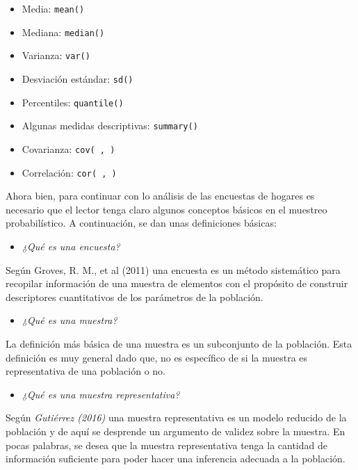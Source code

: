 \documentclass[
  spanish,
  12pt,
]{book}
\providecommand{\tightlist}{%
  \setlength{\itemsep}{0pt}\setlength{\parskip}{0pt}}
\begin{document}
\begin{itemize}
\tightlist
\item
  Media: \texttt{mean()}
\item
  Mediana: \texttt{median()}
\item
  Varianza: \texttt{var()}
\item
  Desviación estándar: \texttt{sd()}
\item
  Percentiles: \texttt{quantile()}
\item
  Algunas medidas descriptivas: \texttt{summary()}
\item
  Covarianza: \texttt{cov(\ ,\ )}
\item
  Correlación: \texttt{cor(\ ,\ )}
\end{itemize}

Ahora bien, para continuar con lo análisis de las encuestas de hogares es necesario que el lector tenga claro algunos conceptos básicos en el muestreo probabilístico. A continuación, se dan unas definiciones básicas:

\begin{itemize}
\tightlist
\item
  \emph{¿Qué es una encuesta?}
\end{itemize}

Según Groves, R. M., et al (2011) una encuesta es un método sistemático para recopilar información de una muestra de elementos con el propósito de construir descriptores cuantitativos de los parámetros de la población.

\begin{itemize}
\tightlist
\item
  \emph{¿Qué es una muestra?}
\end{itemize}

La definición más básica de una muestra es un subconjunto de la población. Esta definición es muy general dado que, no es específico de si la muestra es representativa de una población o no.

\begin{itemize}
\tightlist
\item
  \emph{¿Qué es una muestra representativa?}
\end{itemize}

Según \emph{Gutiérrez (2016)} una muestra representativa es un modelo reducido de la población y de aquí se desprende un argumento de validez sobre la muestra. En pocas palabras, se desea que la muestra representativa tenga la cantidad de información suficiente para poder hacer una inferencia adecuada a la población.
\end{document}

